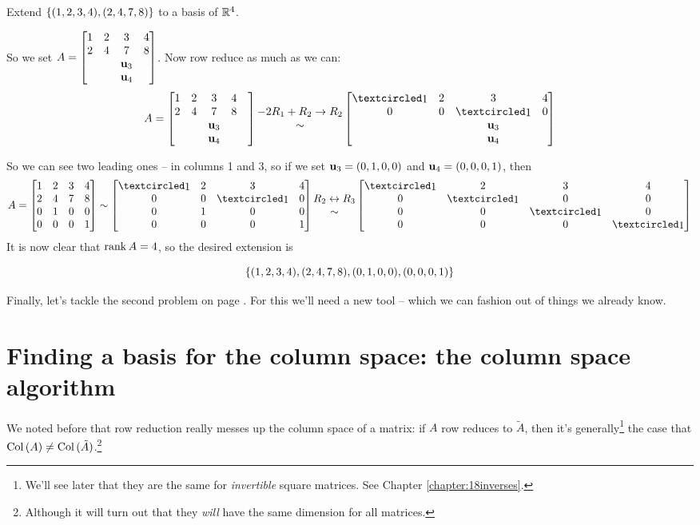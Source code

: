 \begin{myexample}

Extend $\{(1,2,3,4), (2,4,7,8) \}$ to a basis of $\mathbb{R}^4$.


So we set $A=\left[ \begin{matrix} 1&2&3&4\\2&4&7&8\\ &&\mathbf{u}_3 \\ && \mathbf{u}_4 \end{matrix} \right]$. Now row reduce as much as we can:
$$A=\mat{1&2&3&4\\2&4&7&8\\ &&\uu_3 \\ && \uu_4&&}
\begin{matrix} -2R_1+R_2\to R_2\\ \sim\end{matrix} \mat{\pivot&2&3&4\\0&0&\pivot&0\\ &&\uu_3  \\ && \uu_4 } $$

So we can see two leading ones -- in columns 1 and 3, so if we set $\mathbf{u}_3=(0,1,0,0)$ and $\mathbf{u}_4=(0,0,0,1)$, then
$$A =\mat{1&2&3&4\\2&4&7&8\\ 0&1&0&0\\ 0&0&0&1} \sim \mat{\pivot&2&3&4\\0&0&\pivot&0\\ 0&1&0&0  \\  0&0&0&1 }\begin{matrix}  R_2\leftrightarrow R_3\\ \sim\end{matrix} \mat{\pivot&2&3&4\\0&\pivot&0&0 \\ 0&0&\pivot&0  \\  0&0&0&\pivot } $$ It is now clear that $\operatorname{rank} A=4$, so the desired extension is 

$$ \{(1,2,3,4), (2,4,7,8), (0,1,0,0),(0,0,0,1) \}$$
\end{myexample}

Finally, let's tackle the second problem on page \pageref{FindingBases}. For this we'll need a new tool -- which we can fashion out of things we already know.

\section[The column space algorithm]{Finding a basis for the column space: the column space algorithm}

We  noted before that row reduction really messes up the column space of a matrix:  if $A$ row reduces to $\tilde A$,
then it's generally\footnote{We'll see later that they are the same for {\it invertible} square matrices. See Chapter \ref{chapter:18inverses}.} the case that $\operatorname{Col\,}(A) \neq \operatorname{Col\,}(\tilde A)$.\footnote{Although it will turn out that they {\it will}  have the same
dimension for all matrices.} 

